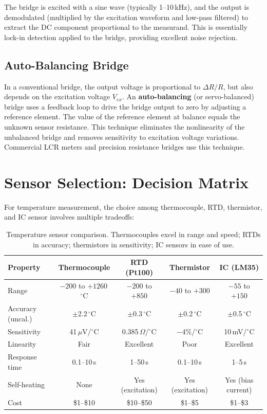 \documentclass[11pt,letterpaper,twoside,openany]{book}
\newcommand{\degC}{\ensuremath{{}^{\circ}\text{C}}}
\begin{document}
The bridge is excited with a sine wave (typically 1--10\,kHz), and the output is demodulated (multiplied by the excitation waveform and low-pass filtered) to extract the DC component proportional to the measurand. This is essentially lock-in detection applied to the bridge, providing excellent noise rejection.

\subsection{Auto-Balancing Bridge}
In a conventional bridge, the output voltage is proportional to $\Delta R/R$, but also depends on the excitation voltage $V_{ex}$. An \textbf{auto-balancing} (or servo-balanced) bridge uses a feedback loop to drive the bridge output to zero by adjusting a reference element. The value of the reference element at balance equals the unknown sensor resistance. This technique eliminates the nonlinearity of the unbalanced bridge and removes sensitivity to excitation voltage variations. Commercial LCR meters and precision resistance bridges use this technique.

\section{Sensor Selection: Decision Matrix}
For temperature measurement, the choice among thermocouple, RTD, thermistor, and IC sensor involves multiple tradeoffs:

\begin{table}[htbp]\centering\small
\begin{tabularx}{\textwidth}{l c c c c}
\toprule
\textbf{Property} & \textbf{Thermocouple} & \textbf{RTD (Pt100)} & \textbf{Thermistor} & \textbf{IC (LM35)} \\
\midrule
Range & $-200$ to $+1260$\,\degC{} & $-200$ to $+850$ & $-40$ to $+300$ & $-55$ to $+150$ \\
Accuracy (uncal.) & $\pm$2.2\,\degC{} & $\pm$0.3\,\degC{} & $\pm$0.2\,\degC{} & $\pm$0.5\,\degC{} \\
Sensitivity & 41\,$\mu$V/\degC{} & 0.385\,$\Omega$/\degC{} & $-$4\%/\degC{} & 10\,mV/\degC{} \\
Linearity & Fair & Excellent & Poor & Excellent \\
Response time & 0.1--10\,s & 1--50\,s & 0.1--10\,s & 1--5\,s \\
Self-heating & None & Yes (excitation) & Yes (excitation) & Yes (bias current) \\
Cost & \$1--\$10 & \$10--\$50 & \$1--\$5 & \$1--\$3 \\
\bottomrule
\end{tabularx}
\caption{Temperature sensor comparison. Thermocouples excel in range and speed; RTDs in accuracy; thermistors in sensitivity; IC sensors in ease of use.}
\end{table}
\end{document}
